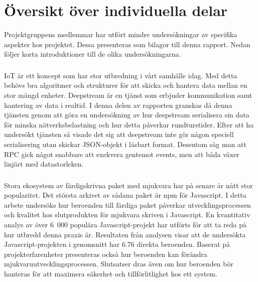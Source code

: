 \chapter{Översikt över individuella delar}
Projektgruppens medlemmar har utfört mindre undersökningar av specifika aspekter hos projektet. Dessa presenteras som bilagor till denna rapport. Nedan följer korta introduktioner till de olika undersökningarna.

\subsection*{}

\subsection*{}

\subsection*{}
IoT är ett koncept som har stor utbredning i vårt samhälle idag. Med detta behövs bra algoritmer och strukturer för att skicka och hantera data mellan en stor mängd enheter. Deepstream är en tjänst som erbjuder kommunikation samt hantering av data i realtid. I denna delen av rapporten granskas då denna tjänsten genom att göra en undersökning av hur deepstream serialisera sin data för minska nätverksbelastning och hur detta påverkar rundturstider. Efter att ha undersökt tjänsten så visade det sig att deepstream inte gör någon speciell serialisering utan skickar JSON-objekt i läsbart format. Dessutom såg man att RPC gick något snabbare att exekvera gentemot events, men att båda växer linjärt med datastorleken.

\subsection*{}

\subsection*{}

\subsection*{}
Stora ekosystem av färdigskrivna paket med mjukvara har på senare år nått stor popularitet. Det största arkivet av sådana paket är npm för Javascript. I detta arbete undersöks hur beroenden till färdiga paket påverkar utvecklingsprocessen och kvalitet hos slutprodukten för mjukvara skriven i Javascript. En kvantitativ analys av över 6~000 populära Javascript-projekt har utförts för att ta reda på hur utbredd denna praxis är. Resultaten från analysen visar att de undersökta Javascript-projekten i genomsnitt har 6.76 direkta beroenden. Baserat på projekterfarenheter presenteras också hur beroenden kan förändra mjukvaruutvecklingsprocessen. Slutsatser dras även om hur beroenden bör hanteras för att maximera säkerhet och tillförlitlighet hos ett system.

